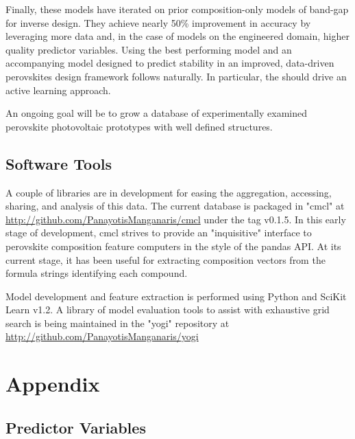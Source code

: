 \documentclass[aip, jmp, amsmath, amssymb, nofootinbib]{revtex4-2}
\begin{document}
Finally, these models have iterated on prior composition-only models
of band-gap for inverse
design\cite{mannodi-kanakkithodi-2022-data-driven}. They achieve nearly
50\% improvement in accuracy by leveraging more data and, in the case
of models on the engineered domain, higher quality predictor
variables. Using the best performing model and an accompanying model
designed to predict stability in an improved, data-driven perovskites
design framework follows naturally.  In particular, the  should
drive an active learning approach.

An ongoing goal will be to grow a database of experimentally examined
perovskite photovoltaic prototypes with well defined structures.

\subsection*{Software Tools}
\label{sec:org5dc4d1d}
A couple of libraries are in development for easing the aggregation,
accessing, sharing, and analysis of this data. The current database is
packaged in "cmcl" at \url{http://github.com/PanayotisManganaris/cmcl} under
the tag v0.1.5. In this early stage of development, cmcl strives to
provide an "inquisitive" interface to perovskite composition feature
computers in the style of the pandas API. At its current stage, it has
been useful for extracting composition vectors from the formula
strings identifying each compound.

Model development and feature extraction is performed using Python and
SciKit Learn v1.2. A library of model evaluation tools to assist with
exhaustive grid search is being maintained in the "yogi" repository at
\url{http://github.com/PanayotisManganaris/yogi}

\section*{}
\label{sec:org6f38b5f}
\pagebreak


\printglossaries

\section*{Appendix}
\label{sec:orgccbda34}
\subsection*{Predictor Variables}
\label{sec:orgff08faf}
 
\end{document}
